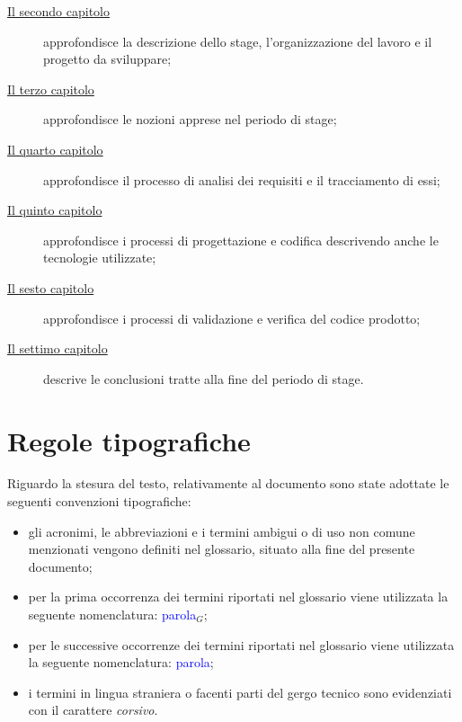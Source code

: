 \begin{description}
    \item[{\hyperref[cap:descrizione-stage]{Il secondo capitolo}}] approfondisce la descrizione dello stage, l'organizzazione del lavoro e il progetto da sviluppare;
    
    \item[{\hyperref[cap:nozioni-apprese]{Il terzo capitolo}}] approfondisce le nozioni apprese nel periodo di stage;
    
    \item[{\hyperref[cap:analisi-requisiti]{Il quarto capitolo}}] approfondisce il processo di analisi dei requisiti e il tracciamento di essi;
    
    \item[{\hyperref[cap:progettazione-codifica]{Il quinto capitolo}}] approfondisce i processi di progettazione e codifica descrivendo anche le tecnologie utilizzate;
    
    \item[{\hyperref[cap:verifica-validazione]{Il sesto capitolo}}] approfondisce i processi di validazione e verifica del codice prodotto;
    
    \item[{\hyperref[cap:conclusioni]{Il settimo capitolo}}] descrive le conclusioni tratte alla fine del periodo di stage.
\end{description}

\section{Regole tipografiche}

Riguardo la stesura del testo, relativamente al documento sono state adottate le seguenti convenzioni tipografiche:
\begin{itemize}
	\item gli acronimi, le abbreviazioni e i termini ambigui o di uso non comune menzionati vengono definiti nel glossario, situato alla fine del presente documento;
	\item per la prima occorrenza dei termini riportati nel glossario viene utilizzata la seguente nomenclatura: \textcolor{blue}{parola}$_G$;
	\item per le successive occorrenze dei termini riportati nel glossario viene utilizzata la seguente nomenclatura: \textcolor{blue}{parola};
	\item i termini in lingua straniera o facenti parti del gergo tecnico sono evidenziati con il carattere \emph{corsivo}.
\end{itemize}